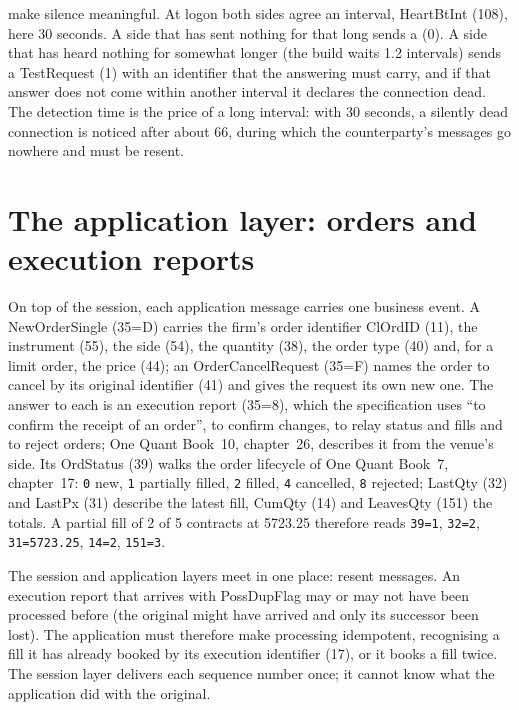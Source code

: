 make silence meaningful. At logon both sides agree an interval, HeartBtInt (108), here 30 seconds. A side that has
sent nothing for that long sends a  (0). A side that has heard nothing for somewhat longer (the build waits 1.2
intervals) sends a TestRequest (1) with an identifier that the answering  must carry, and if that answer does not
come within another interval it declares the connection dead. The detection time is the price of a long interval: with 30
seconds, a silently dead connection is noticed after about 66, during which the counterparty's messages go nowhere and must be
resent.

\label{lst:ll:protocols-i-fix:seq}

\section{The application layer: orders and execution reports}

On top of the session, each application message carries one business event. A NewOrderSingle (35=D) carries the firm's order
identifier ClOrdID (11), the instrument (55), the side (54), the quantity (38), the order type (40) and, for a limit order,
the price (44); an OrderCancelRequest (35=F) names the order to cancel by its original identifier (41) and gives the request
its own new one. The answer to each is an execution report (35=8), which the specification uses ``to confirm the receipt of
an order'', to confirm changes, to relay status and fills and to reject orders; One Quant Book~10, chapter~26, describes it
from the venue's side. Its OrdStatus (39) walks the order lifecycle of One Quant Book~7, chapter~17: \texttt{0} new,
\texttt{1} partially filled, \texttt{2} filled, \texttt{4} cancelled, \texttt{8} rejected; LastQty (32) and LastPx (31)
describe the latest fill, CumQty (14) and LeavesQty (151) the totals. A partial fill of 2 of 5 contracts at 5723.25 therefore
reads \texttt{39=1}, \texttt{32=2}, \texttt{31=5723.25}, \texttt{14=2}, \texttt{151=3}.

The session and application layers meet in one place: resent messages. An execution report that arrives with PossDupFlag
may or may not have been processed before (the original might have arrived and only its successor been lost). The application
must therefore make processing idempotent, recognising a fill it has already booked by its execution identifier (17), or it
books a fill twice. The session layer delivers each sequence number once; it cannot know what the application did with
the original.

